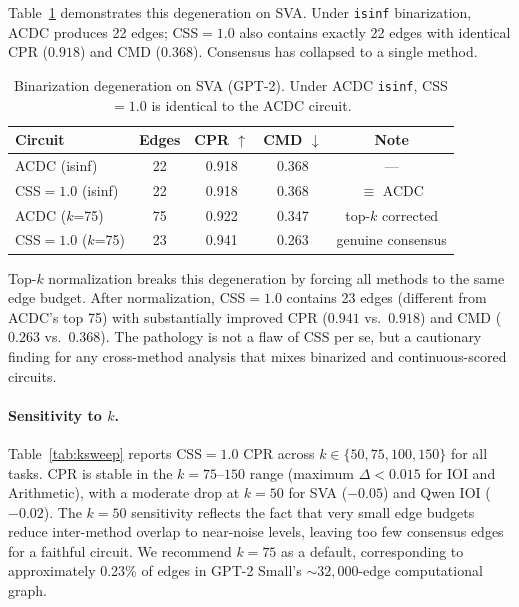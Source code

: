 \documentclass[11pt,a4paper]{article}
\newcommand{\css}{\textsc{CSS}}
\begin{document}
Table~\ref{tab:degen} demonstrates this degeneration on SVA.
Under \texttt{isinf} binarization, ACDC produces 22 edges; \css{}$=1.0$ also contains exactly 22 edges with identical CPR ($0.918$) and CMD ($0.368$).
Consensus has collapsed to a single method.

\begin{table}[t]
\centering
\small
\caption{Binarization degeneration on SVA (GPT-2). Under ACDC \texttt{isinf}, \css{}$=1.0$ is identical to the ACDC circuit.}
\label{tab:degen}
\begin{tabular}{@{}lcccc@{}}
\toprule
Circuit & Edges & CPR $\uparrow$ & CMD $\downarrow$ & Note \\
\midrule
ACDC (isinf) & 22 & 0.918 & 0.368 & --- \\
\css{}$=1.0$ (isinf) & 22 & 0.918 & 0.368 & $\equiv$ ACDC \\
\midrule
ACDC ($k$=75) & 75 & 0.922 & 0.347 & top-$k$ corrected \\
\css{}$=1.0$ ($k$=75) & 23 & 0.941 & 0.263 & genuine consensus \\
\bottomrule
\end{tabular}
\end{table}

Top-$k$ normalization breaks this degeneration by forcing all methods to the same edge budget.
After normalization, \css{}$=1.0$ contains 23 edges (different from ACDC's top 75) with substantially improved CPR ($0.941$ vs.\ $0.918$) and CMD ($0.263$ vs.\ $0.368$).
The pathology is not a flaw of \css{} per se, but a cautionary finding for any cross-method analysis that mixes binarized and continuous-scored circuits.

\paragraph{Sensitivity to $k$.}
Table~\ref{tab:ksweep} reports \css{}$=1.0$ CPR across $k \in \{50, 75, 100, 150\}$ for all tasks.
CPR is stable in the $k\!=\!75$--$150$ range (maximum $\Delta < 0.015$ for IOI and Arithmetic), with a moderate drop at $k\!=\!50$ for SVA ($-0.05$) and Qwen IOI ($-0.02$).
The $k\!=\!50$ sensitivity reflects the fact that very small edge budgets reduce inter-method overlap to near-noise levels, leaving too few consensus edges for a faithful circuit.
We recommend $k\!=\!75$ as a default, corresponding to approximately 0.23\% of edges in GPT-2 Small's ${\sim}32{,}000$-edge computational graph.
\end{document}
